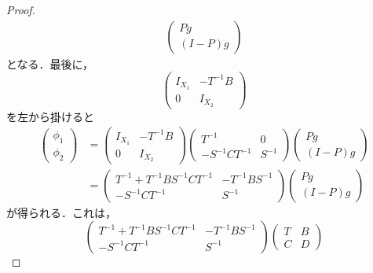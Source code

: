 \documentclass[11pt,a4paper,titlepage]{jsreport}
\theoremstyle{definition}
\begin{document}
\begin{proof}
\begin{equation*}
\begin{split}
\begin{pmatrix}
        Pg \\
        (I-P)g
      \end{pmatrix}
    \end{split}
  \end{equation*}
  となる．最後に，
  \begin{equation*}
    \begin{pmatrix}
      I_{X_1} & -T^{-1}B \\
      0 & I_{X_2}
    \end{pmatrix}
  \end{equation*}
  を左から掛けると
  \begin{equation*}
    \begin{split}
      \begin{pmatrix}
        \phi_1 \\
        \phi_2
      \end{pmatrix}
      &=
      \begin{pmatrix}
        I_{X_1} & -T^{-1}B \\
        0 & I_{X_2}
      \end{pmatrix}
      \begin{pmatrix}
        T^{-1} & 0 \\
        -S^{-1}CT^{-1} & S^{-1}
      \end{pmatrix}
      \begin{pmatrix}
        Pg \\
        (I-P)g
      \end{pmatrix}\\
      &=
      \begin{pmatrix}
        T^{-1}+T^{-1}BS^{-1}CT^{-1} & -T^{-1}BS^{-1} \\
        -S^{-1}CT^{-1} & S^{-1}
      \end{pmatrix}
      \begin{pmatrix}
        Pg \\
        (I-P)g
      \end{pmatrix}
    \end{split}
  \end{equation*}
  が得られる．これは，
  \begin{equation*}
    \begin{pmatrix}
      T^{-1}+T^{-1}BS^{-1}CT^{-1} & -T^{-1}BS^{-1} \\
      -S^{-1}CT^{-1} & S^{-1}
    \end{pmatrix}
    \begin{pmatrix}
      T & B \\
      C & D

\end{pmatrix}
\end{equation*}
\end{proof}
\end{document}
